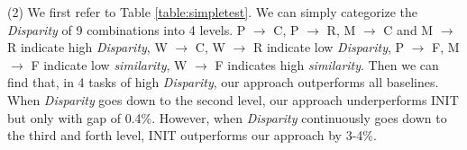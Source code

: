 (2) We first refer to Table \ref{table:simpletest}. We can simply categorize the \textit{Disparity} of 9 combinations into 4 levels. P $\rightarrow$ C, P $\rightarrow$ R, M $\rightarrow$ C and M $\rightarrow$ R indicate high \textit{Disparity}, W $\rightarrow$ C, W $\rightarrow$ R indicate low \textit{Disparity}, P $\rightarrow$ F, M $\rightarrow$ F indicate low \textit{similarity}, W $\rightarrow$ F indicates high \textit{similarity}. Then we can find that, in 4 tasks of high \textit{Disparity}, our approach outperforms all baselines. When \textit{Disparity} goes down to the second level, our approach underperforms INIT but only with gap of 0.4\%. However, when \textit{Disparity} continuously goes down to the third and forth level, INIT outperforms our approach by 3-4\%.


